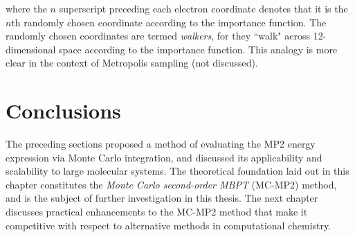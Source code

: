 \noindent where the $n$ superscript preceding each electron coordinate denotes
that it is the $n$th randomly chosen coordinate according to the importance
function. The randomly chosen coordinates are termed \emph{walkers}, for they
``walk" across 12-dimensional space according to the importance function. This
analogy is more clear in the context of Metropolis sampling (not discussed).

\section{Conclusions}

The preceding sections proposed a method of evaluating the MP2 energy expression
via Monte Carlo integration, and discussed its applicability and scalability to
large molecular systems.  The theoretical foundation laid out in this chapter
constitutes the \emph{Monte Carlo second-order MBPT} (MC-MP2) method, and is the
subject of further investigation in this thesis. The next chapter discusses
practical enhancements to the MC-MP2 method that make it competitive with
respect to alternative methods in computational chemistry.
